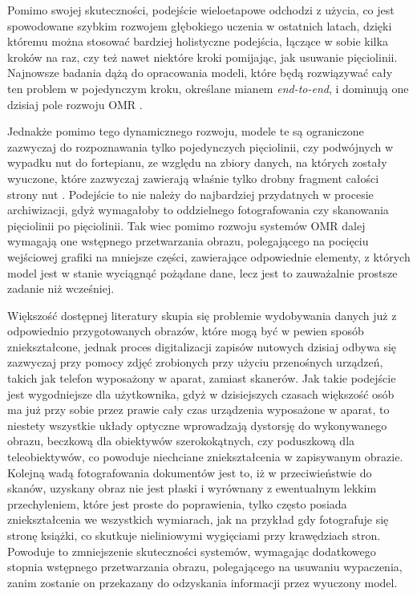 \documentclass[xodstep]{wnspt}
\begin{document}
Pomimo swojej skuteczności, podejście wieloetapowe odchodzi z użycia, co jest spowodowane szybkim rozwojem głębokiego uczenia w ostatnich latach, dzięki któremu można stosować bardziej holistyczne podejścia, łączące w sobie kilka kroków na raz, czy też nawet niektóre kroki pomijając, jak usuwanie pięciolinii. Najnowsze badania dążą do opracowania modeli, które będą rozwiązywać cały ten problem w pojedynczym kroku, określane mianem \textit{end-to-end}, i dominują one dzisiaj pole rozwoju OMR \cite{Calvo-Zaragoza2018}\cite{Rios-Vila2023}. 

Jednakże pomimo tego dynamicznego rozwoju, modele te są ograniczone zazwyczaj do rozpoznawania tylko pojedynczych pięciolinii, czy podwójnych w wypadku nut do fortepianu, ze względu na zbiory danych, na których zostały wyuczone, które zazwyczaj zawierają właśnie tylko drobny fragment całości strony nut \cite{Calvo-Zaragoza2018b}\cite{Shatri2021}. Podejście to nie należy do najbardziej przydatnych w procesie archiwizacji, gdyż wymagałoby to oddzielnego fotografowania czy skanowania pięciolinii po pięciolinii. Tak wiec pomimo rozwoju systemów OMR dalej wymagają one wstępnego przetwarzania obrazu, polegającego na pocięciu wejściowej grafiki na mniejsze części, zawierające odpowiednie elementy, z których model jest w stanie wyciągnąć pożądane dane, lecz jest to zauważalnie prostsze zadanie niż wcześniej. 

Większość dostępnej literatury skupia się problemie wydobywania danych już z odpowiednio przygotowanych obrazów, które mogą być w pewien sposób zniekształcone, jednak proces digitalizacji zapisów nutowych dzisiaj odbywa się zazwyczaj przy pomocy zdjęć zrobionych przy użyciu przenośnych urządzeń, takich jak telefon wyposażony w aparat, zamiast skanerów. Jak takie podejście jest wygodniejsze dla użytkownika, gdyż w dzisiejszych czasach większość osób ma już przy sobie przez prawie cały czas urządzenia wyposażone w aparat, to niestety wszystkie układy optyczne wprowadzają dystorsję do wykonywanego obrazu, beczkową dla obiektywów szerokokątnych, czy poduszkową dla teleobiektywów, co powoduje niechciane zniekształcenia w zapisywanym obrazie. Kolejną wadą fotografowania dokumentów jest to, iż w przeciwieństwie do skanów, uzyskany obraz nie jest płaski i wyrównany z ewentualnym lekkim przechyleniem, które jest proste do poprawienia, tylko często posiada zniekształcenia we wszystkich wymiarach, jak na przykład gdy fotografuje się stronę książki, co skutkuje nieliniowymi wygięciami przy krawędziach stron. Powoduje to zmniejszenie skuteczności systemów, wymagając dodatkowego stopnia wstępnego przetwarzania obrazu, polegającego na usuwaniu wypaczenia, zanim zostanie on przekazany do odzyskania informacji przez wyuczony model.
\end{document}
